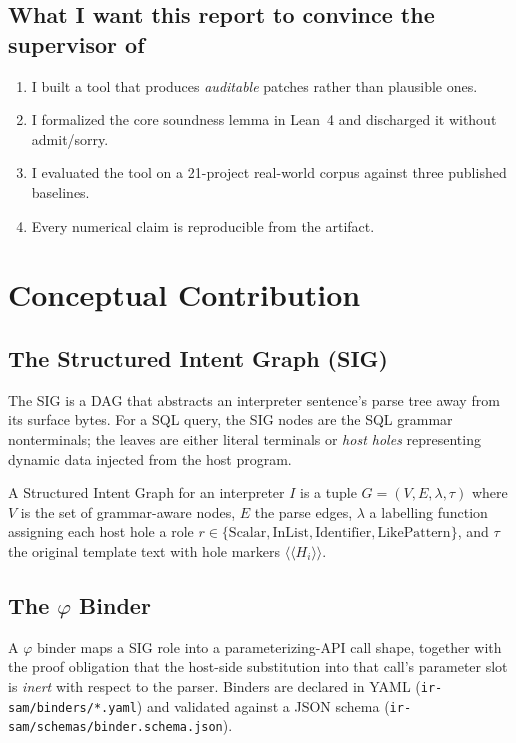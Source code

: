 \documentclass[a4paper,11pt]{report}
\begin{document}
\section{What I want this report to convince the supervisor of}
\begin{enumerate}
\item I built a tool that produces \emph{auditable} patches rather than plausible ones.
\item I formalized the core soundness lemma in Lean~4 and discharged it without admit/sorry.
\item I evaluated the tool on a 21-project real-world corpus against three published baselines.
\item Every numerical claim is reproducible from the artifact.
\end{enumerate}

\chapter{Conceptual Contribution}\label{ch:concept}
\section{The Structured Intent Graph (SIG)}
The SIG is a DAG that abstracts an interpreter sentence's parse tree away from its surface bytes. For a SQL query, the SIG nodes are the SQL grammar nonterminals; the leaves are either literal terminals or \emph{host holes} representing dynamic data injected from the host program.

\begin{tcolorbox}[colback=blue!5,colframe=blue!50!black,title=Definition: SIG]
A Structured Intent Graph for an interpreter $I$ is a tuple $G = (V, E, \lambda, \tau)$ where $V$ is the set of grammar-aware nodes, $E$ the parse edges, $\lambda$ a labelling function assigning each host hole a role $r \in \{\text{Scalar}, \text{InList}, \text{Identifier}, \text{LikePattern}\}$, and $\tau$ the original template text with hole markers $\langle\langle H_i\rangle\rangle$.
\end{tcolorbox}

\section{The \texorpdfstring{$\varphi$}{phi} Binder}
A $\varphi$ binder maps a SIG role into a parameterizing-API call shape, together with the proof obligation that the host-side substitution into that call's parameter slot is \emph{inert} with respect to the parser. Binders are declared in YAML (\texttt{ir-sam/binders/*.yaml}) and validated against a JSON schema (\texttt{ir-sam/schemas/binder.schema.json}).
\end{document}
